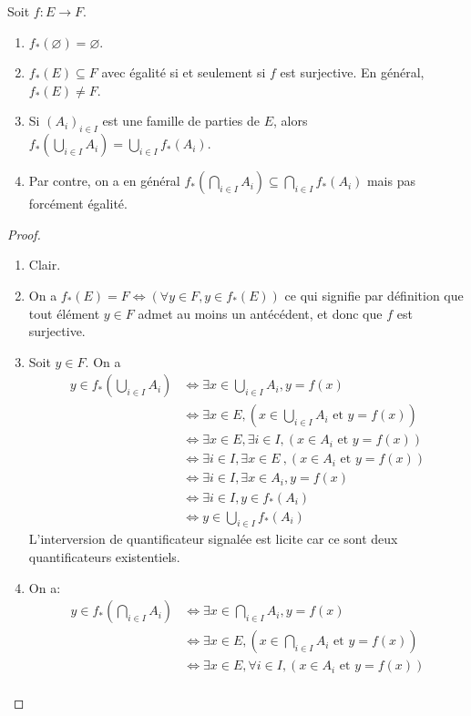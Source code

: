 \begin{proposition}
Soit $f : E\to F$.
\begin{enumerate}
\item $f_*(\varnothing)=\varnothing$.
\item $f_*(E)\subseteq F$ avec égalité si et seulement si $f$ est surjective. En général, $f_*(E)\neq F$.
\item Si $(A_i)_{i\in I}$ est une famille de parties de $E$, alors $f_*\left(\bigcup_{i\in I}A_i\right) = \bigcup_{i\in I} f_*(A_i)$.
\item [ATTENTION] Par contre, on a en général $f_*\left(\bigcap_{i\in I}A_i\right) \subseteq \bigcap_{i\in I} f_*\left(A_i\right)$ mais pas forcément égalité.
\end{enumerate}
\end{proposition}
\begin{proof}
\begin{enumerate}
\item Clair.
\item On a $f_*(E)=F \iff (\forall y\in F, y\in f_*(E))$ ce qui signifie par définition que tout élément $y\in F$ admet au moins un antécédent, et donc que $f$ est surjective.  
\item Soit $y\in F$. On a 
\begin{align*}
y\in f_*\left( \bigcup_{i\in I} A_i \right)
&\iff \exists x\in  \bigcup_{i\in I} A_i,   y=f(x) \\
&\iff \exists x\in E, \left( x\in \bigcup_{i\in I} A_i\text{ et }  y=f(x)\right)\\
&\iff \exists x\in E, \exists i\in I,  (x\in A_i\text{ et } y=f(x)) \\
&\boxed{\iff \exists i\in I, \exists x\in E}\:, (x\in A_i\text{ et } y=f(x))\\
&\iff \exists i\in I, \exists x\in A_i, y=f(x)\\
&\iff \exists i\in I, y\in f_*(A_i)\\
&\iff y\in \bigcup_{i\in I} f_*(A_i)
\end{align*}
L'interversion de quantificateur signalée est licite car ce sont deux quantificateurs existentiels.
\item On a:
\begin{align*}
y\in f_*\left( \bigcap_{i\in I} A_i \right)
&\iff \exists x\in  \bigcap_{i\in I} A_i,   y=f(x) \\
&\iff \exists x\in E, \left( x\in \bigcap_{i\in I} A_i\text{ et }  y=f(x)\right)\\
&\iff \exists x\in E, \forall i\in I,  (x\in A_i\text{ et } y=f(x)) \\

\end{align*}
\end{enumerate}
\end{proof}
